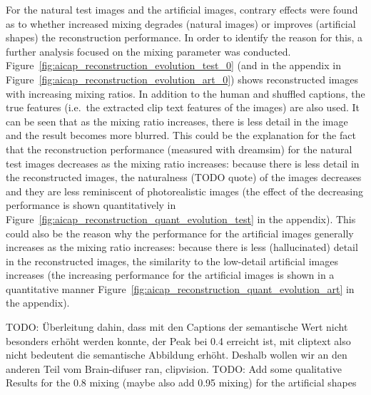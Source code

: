 For the natural test images and the artificial images, contrary effects were found as to whether increased mixing degrades (natural images) or improves (artificial shapes) the reconstruction performance. In order to identify the reason for this, a further analysis focused on the mixing parameter was conducted. Figure~\ref{fig:aicap_reconstruction_evolution_test_0} (and in the appendix in Figure~\ref{fig:aicap_reconstruction_evolution_art_0}) shows reconstructed images with increasing mixing ratios. In addition to the human and shuffled captions, the true features (i.e.\ the extracted clip text features of the images) are also used. It can be seen that as the mixing ratio increases, there is less detail in the image and the result becomes more blurred. This could be the explanation for the fact that the reconstruction performance (measured with dreamsim) for the natural test images decreases as the mixing ratio increases: because there is less detail in the reconstructed images, the naturalness (TODO quote) of the images decreases and they are less reminiscent of photorealistic images (the effect of the decreasing performance is shown quantitatively in Figure~\ref{fig:aicap_reconstruction_quant_evolution_test} in the appendix). This could also be the reason why the performance for the artificial images generally increases as the mixing ratio increases: because there is less (hallucinated) detail in the reconstructed images, the similarity to the low-detail artificial images increases (the increasing performance for the artificial images is shown in a quantitative manner Figure~\ref{fig:aicap_reconstruction_quant_evolution_art} in the appendix).



TODO: Überleitung dahin, dass mit den Captions der semantische Wert nicht besonders erhöht werden konnte, der Peak bei 0.4 erreicht ist, mit cliptext also nicht bedeutent die semantische Abbildung erhöht. Deshalb wollen wir an den anderen Teil vom Brain-difuser ran, clipvision. 
TODO: Add some qualitative Results for the 0.8 mixing (maybe also add 0.95 mixing) for the artificial shapes
